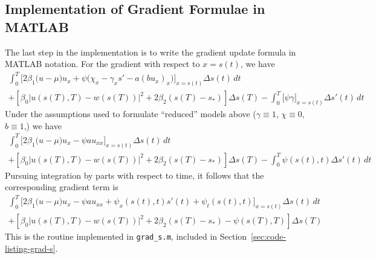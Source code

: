 \documentclass[letterpaper, 10pt]{amsart}
\theoremstyle{definition}
\theoremstyle{remark}
\newcommand{\D}[2]{\frac{\partial{} #1}{\partial{} #2}}
\newcommand{\lnorm}[1]{\left\vert #1\right\vert}%
\begin{document}
\subsection{Implementation of Gradient Formulae in MATLAB}
The last step in the implementation is to write the gradient update formula in MATLAB notation.
For the gradient with respect to $x=s(t)$, we have
\begin{gather*}
  \int_0^T \Big[2\beta_1\big(u - \mu\big)u_x + \psi \big(\chi_x - \gamma_x s'  - a (b u_x)_x \big)\Big]_{x=s(t)} {\Delta s}(t)\,dt \nonumber
  \\
  +
  \left[\beta_0\lnorm{u(s(T),T) - w(s(T))}^2 + 2 \beta_2 (s(T) - s_*)\right] {\Delta s}(T) 
  - \int_0^T \big[\psi \gamma\big]_{x=s(t)} {\Delta s}'(t) \,dt
\end{gather*}
Under the assumptions used to formulate ``reduced'' models above ($\gamma \equiv 1$, $\chi \equiv 0$, $b\equiv 1$,) we have
\begin{gather*}
  \int_0^T \Big[2\beta_1\big(u - \mu\big)u_x - \psi  a u_{xx} \Big]_{x=s(t)} {\Delta s}(t)\,dt \nonumber
  \\
  +
  \left[\beta_0\lnorm{u(s(T),T) - w(s(T))}^2 + 2 \beta_2 (s(T) - s_*)\right] {\Delta s}(T) 
  - \int_0^T \psi(s(t),t) {\Delta s}'(t) \,dt
\end{gather*}
Pursuing integration by parts with respect to time, it follows that the corresponding gradient term is
\begin{gather*}
  \int_0^T \Big[2\beta_1\big(u - \mu\big)u_x - \psi  a u_{xx}
  + \psi_x(s(t),t) s'(t) + \psi_t(s(t),t)\Big]_{x=s(t)} {\Delta s}(t)\,dt \nonumber
  \\
  +
  \left[\beta_0\lnorm{u(s(T),T) - w(s(T))}^2 + 2 \beta_2 (s(T) - s_*) - \psi(s(T),T)\right] {\Delta s}(T) 
\end{gather*}
This is the routine implemented in \verb+grad_s.m+, included in Section~\ref{sec:code-listing-grad-s}.
\end{document}
